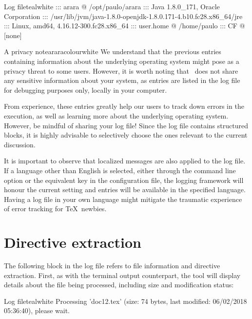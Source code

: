 \begin{codebox}{Log file}{teal}{\icnote}{white}
::: arara @ /opt/paulo/arara
::: Java 1.8.0_171, Oracle Corporation
::: /usr/lib/jvm/java-1.8.0-openjdk-1.8.0.171-4.b10.fc28.x86_64/jre
::: Linux, amd64, 4.16.12-300.fc28.x86_64
::: user.home @ /home/paulo
::: CF @ [none]
\end{codebox}

\begin{messagebox}{A privacy note}{araracolour}{\icok}{white}
\setlength{\parskip}{1em}
We understand that the previous entries containing information about the underlying operating system might pose as a privacy threat to some users. However, it is worth noting that \arara\ does not share any sensitive information about your system, as entries are listed in the log file for debugging purposes only, locally in your computer.

From experience, these entries greatly help our users to track down errors in the execution, as well as learning more about the underlying operating system. However, be mindful of sharing your log file! Since the log file contains structured blocks, it is highly advisable to selectively choose the ones relevant to the current discussion.
\end{messagebox}

It is important to observe that localized messages are also applied to the log file. If a language other than English is selected, either through the  command line option or the equivalent key in the configuration file, the logging framework will honour the current setting and entries will be available in the specified language. Having a log file in your own language might mitigate the traumatic experience of error tracking for \TeX\ newbies.

\section{Directive extraction}
\label{sec:directiveextraction}

The following block in the log file refers to file information and directive extraction. First, as with the terminal output counterpart, the tool will display details about the file being processed, including size and modification status:

\begin{codebox}{Log file}{teal}{\icnote}{white}
Processing 'doc12.tex' (size: 74 bytes, last modified:
06/02/2018 05:36:40), please wait.
\end{codebox}


